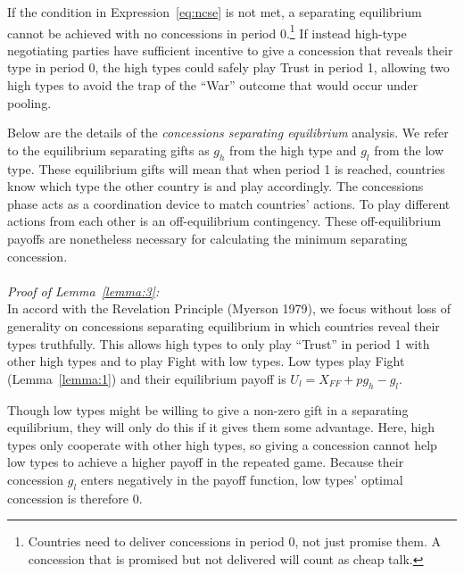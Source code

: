 \documentclass[12pt, letterpaper]{article}
\begin{document}
{If the condition in Expression~\ref{eq:ncse} is not met, a separating equilibrium cannot be achieved with no concessions in period 0.\footnote{Countries need to deliver concessions in period 0, not just promise them. A concession that is promised but not delivered will count as cheap talk.} If instead high-type negotiating parties have sufficient incentive to give a concession that reveals their type in period 0, the high types could safely play Trust in period 1, allowing two high types to avoid the trap of the ``War'' outcome that would occur under pooling. 

Below are the details of the \emph{concessions separating equilibrium} analysis. We refer to the equilibrium separating gifts as $g_h$ from the high type and $g_l$ from the low type. These equilibrium gifts will mean that when period 1 is reached, countries know which type the other country is and play accordingly. The concessions phase acts as a coordination device to match countries' actions. To play different actions from each other is an off-equilibrium contingency. These off-equilibrium payoffs are nonetheless necessary for calculating the minimum separating concession. 
\\
\\
\emph{Proof of Lemma~\ref{lemma:3}:}\\
In accord with the Revelation Principle (Myerson 1979), we focus without loss of generality on concessions separating equilibrium in which countries reveal their types truthfully. This allows high types to only play ``Trust'' in period 1 with other high types and to play Fight with low types. Low types play Fight (Lemma~\ref{lemma:1}) and their equilibrium payoff is $U_l=X_{FF}+ pg_h-g_l$.

Though low types might be willing to give a non-zero gift in a separating equilibrium, they will only do this if it gives them some advantage. Here, high types only cooperate with other high types, so giving a concession cannot help low types to achieve a higher payoff in the repeated game. Because their concession $g_l$ enters negatively in the payoff function, low types' optimal concession is therefore 0.

}
\end{document}
